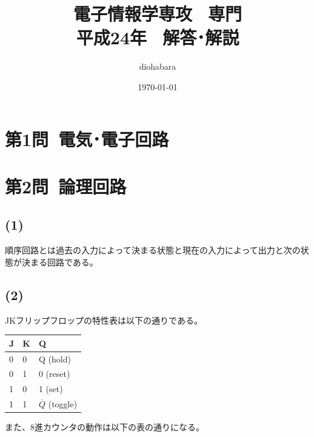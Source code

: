 \documentclass[a4paper,12pt,xelatex,ja=standard]{bxjsarticle}
\title{電子情報学専攻 \, 専門 \\ 平成24年 \, 解答･解説}
\author{diohabara}
\date{\today}
\begin{document}
\maketitle

\section*{第1問\ 電気･電子回路}

\section*{第2問\ 論理回路}
\subsection*{(1)}
順序回路とは過去の入力によって決まる状態と現在の入力によって出力と次の状態が決まる回路である。

\subsection*{(2)}

JKフリップフロップの特性表は以下の通りである。

\begin{table}[H]
  \begin{tabular}{|l|l|l|}
  \hline
  J & K & Q                  \\ \hline \hline
  0 & 0 & Q (hold)           \\ \hline
  0 & 1 & 0 (reset)          \\ \hline
  1 & 0 & 1 (set)            \\ \hline
  1 & 1 & $\overline{Q}$ (toggle) \\ \hline
  \end{tabular}
\end{table}

また、8進カウンタの動作は以下の表の通りになる。
\end{document}
